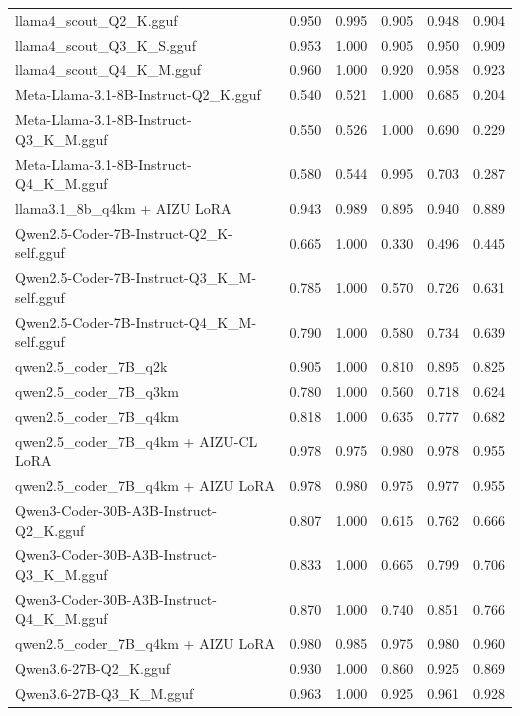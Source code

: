 \begin{table}[htbp]
{\begin{tabular}{lrrrrr}
    llama4\_scout\_Q2\_K.gguf & 0.950 & 0.995 & 0.905 & 0.948 & 0.904 \\
    llama4\_scout\_Q3\_K\_S.gguf & 0.953 & 1.000 & 0.905 & 0.950 & 0.909 \\
    llama4\_scout\_Q4\_K\_M.gguf & 0.960 & 1.000 & 0.920 & 0.958 & 0.923 \\
    Meta-Llama-3.1-8B-Instruct-Q2\_K.gguf & 0.540 & 0.521 & 1.000 & 0.685 & 0.204 \\
    Meta-Llama-3.1-8B-Instruct-Q3\_K\_M.gguf & 0.550 & 0.526 & 1.000 & 0.690 & 0.229 \\
    Meta-Llama-3.1-8B-Instruct-Q4\_K\_M.gguf & 0.580 & 0.544 & 0.995 & 0.703 & 0.287 \\
    llama3.1\_8b\_q4km + AIZU LoRA & 0.943 & 0.989 & 0.895 & 0.940 & 0.889 \\
    Qwen2.5-Coder-7B-Instruct-Q2\_K-self.gguf & 0.665 & 1.000 & 0.330 & 0.496 & 0.445 \\
    Qwen2.5-Coder-7B-Instruct-Q3\_K\_M-self.gguf & 0.785 & 1.000 & 0.570 & 0.726 & 0.631 \\
    Qwen2.5-Coder-7B-Instruct-Q4\_K\_M-self.gguf & 0.790 & 1.000 & 0.580 & 0.734 & 0.639 \\
    qwen2.5\_coder\_7B\_q2k & 0.905 & 1.000 & 0.810 & 0.895 & 0.825 \\
    qwen2.5\_coder\_7B\_q3km & 0.780 & 1.000 & 0.560 & 0.718 & 0.624 \\
    qwen2.5\_coder\_7B\_q4km & 0.818 & 1.000 & 0.635 & 0.777 & 0.682 \\
    qwen2.5\_coder\_7B\_q4km + AIZU-CL LoRA & 0.978 & 0.975 & 0.980 & 0.978 & \cellcolor{green!30}0.955 \\
    qwen2.5\_coder\_7B\_q4km + AIZU LoRA & 0.978 & 0.980 & 0.975 & 0.977 & \cellcolor{green!20}0.955 \\
    Qwen3-Coder-30B-A3B-Instruct-Q2\_K.gguf & 0.807 & 1.000 & 0.615 & 0.762 & 0.666 \\
    Qwen3-Coder-30B-A3B-Instruct-Q3\_K\_M.gguf & 0.833 & 1.000 & 0.665 & 0.799 & 0.706 \\
    Qwen3-Coder-30B-A3B-Instruct-Q4\_K\_M.gguf & 0.870 & 1.000 & 0.740 & 0.851 & 0.766 \\
    qwen2.5\_coder\_7B\_q4km + AIZU LoRA & 0.980 & 0.985 & 0.975 & 0.980 & \cellcolor{green!50}0.960 \\
    Qwen3.6-27B-Q2\_K.gguf & 0.930 & 1.000 & 0.860 & 0.925 & 0.869 \\
    Qwen3.6-27B-Q3\_K\_M.gguf & 0.963 & 1.000 & 0.925 & 0.961 & 0.928 \\

\end{tabular}}
\end{table}
